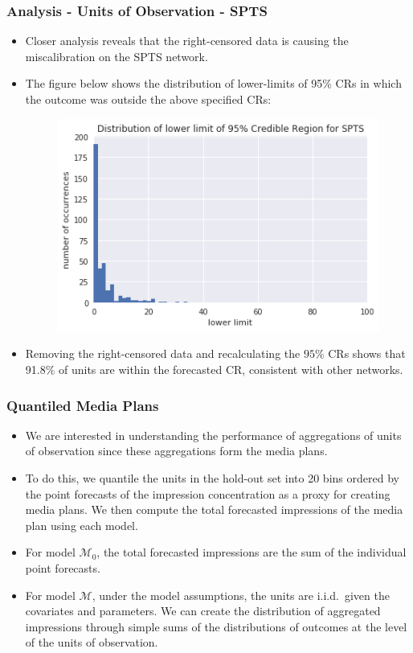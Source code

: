 \documentclass{beamer}
\begin{document}
\begin{frame}
\frametitle{Analysis - Units of Observation - SPTS}

\begin{itemize}
  \item Closer analysis reveals that the right-censored data is causing the miscalibration
    on the SPTS network.
    \pause
  \item The figure below shows the distribution of lower-limits of 95\% CRs in which
    the outcome was outside the above specified CRs:
    \begin{figure}[!h]
      \centering
      \includegraphics[scale=0.4]{SPTS_CR_analysis}
    \end{figure}
  \item Removing the right-censored data and recalculating the $95\%$ CRs shows that
    91.8\% of units are within the forecasted CR, consistent with other networks.
\end{itemize}

\end{frame}

\begin{frame}
\frametitle{Quantiled Media Plans}

\begin{itemize}
  \item We are interested in understanding the performance of aggregations of units of observation
    since these aggregations form the media plans.
    \pause
  \item To do this, we quantile the units in the hold-out set into 20 bins ordered by the point forecasts
    of the impression concentration as a proxy for creating media plans. We then compute the total forecasted
    impressions of the media plan using each model.
   \pause
  \item For model $\mathcal{M}_0$, the total forecasted impressions are the sum of the individual point forecasts.
    \pause
  \item For model $\mathcal{M}$, under the model assumptions, the units are i.i.d.\ given the covariates and parameters.
    We can create the distribution of aggregated impressions through simple sums of the distributions of outcomes at the level of the units of observation.
\end{itemize}
\end{frame}
\end{document}
